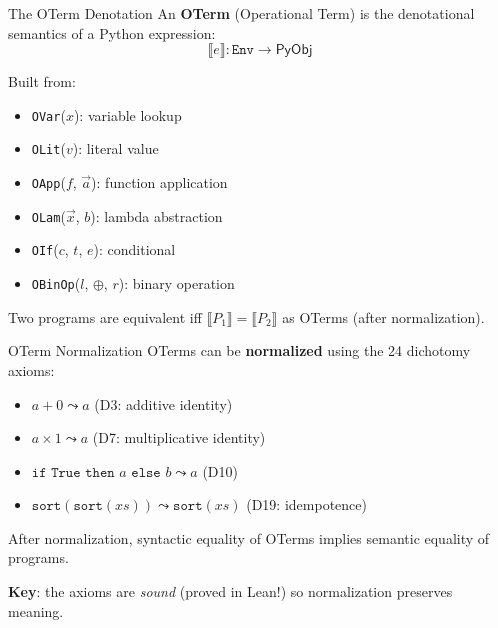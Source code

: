 \documentclass[aspectratio=169,11pt]{beamer}
\newcommand{\PyObj}{\mathsf{PyObj}}
\newcommand{\den}[1]{\llbracket #1 \rrbracket}
\begin{document}
\begin{frame}{The OTerm Denotation}
An \textbf{OTerm} (Operational Term) is the denotational semantics of a Python expression:
\[
\den{e} : \texttt{Env} \to \PyObj
\]

\vspace{0.5em}
Built from:
\begin{itemize}
\item \texttt{OVar}($x$): variable lookup
\item \texttt{OLit}($v$): literal value
\item \texttt{OApp}($f$, $\vec{a}$): function application
\item \texttt{OLam}($\vec{x}$, $b$): lambda abstraction
\item \texttt{OIf}($c$, $t$, $e$): conditional
\item \texttt{OBinOp}($l$, $\oplus$, $r$): binary operation
\end{itemize}

\vspace{0.3em}
Two programs are equivalent iff $\den{P_1} = \den{P_2}$ as OTerms (after normalization).
\end{frame}

\begin{frame}{OTerm Normalization}
OTerms can be \textbf{normalized} using the 24 dichotomy axioms:

\vspace{0.3em}
\begin{itemize}
\item $a + 0 \leadsto a$ \hfill (D3: additive identity)
\item $a \times 1 \leadsto a$ \hfill (D7: multiplicative identity)
\item $\texttt{if True then } a \texttt{ else } b \leadsto a$ \hfill (D10)
\item $\texttt{sort}(\texttt{sort}(xs)) \leadsto \texttt{sort}(xs)$ \hfill (D19: idempotence)
\end{itemize}

\vspace{0.5em}
After normalization, syntactic equality of OTerms implies semantic equality of programs.

\vspace{0.5em}
\textbf{Key}: the axioms are \emph{sound} (proved in Lean!) so normalization preserves meaning.
\end{frame}
\end{document}

